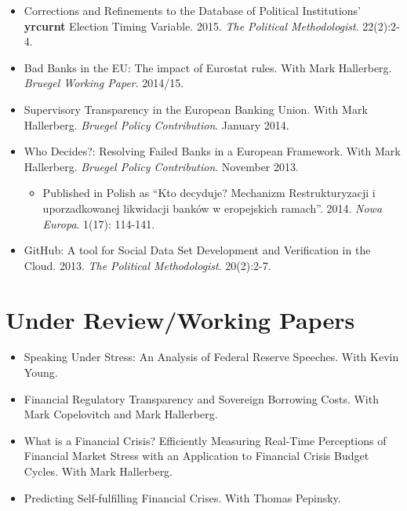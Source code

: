 \documentclass[a4paper]{article}
\begin{document}
{\begin{itemize}
    \item Corrections and Refinements to the Database of Political Institutions' \textbf{yrcurnt} Election Timing Variable. 2015. {\emph{The Political Methodologist}}. 22(2):2-4.

    \item Bad Banks in the EU: The impact of Eurostat rules. With Mark Hallerberg. \emph{Bruegel Working Paper}. 2014/15.

    \item Supervisory Transparency in the European Banking Union. With Mark Hallerberg. {\emph{Bruegel Policy Contribution}}. January 2014.

    \item Who Decides?: Resolving Failed Banks in a European Framework. With Mark Hallerberg. {\emph{Bruegel Policy Contribution}}. November 2013.

      \begin{itemize}
        \item Published in Polish as ``Kto decyduje? Mechanizm Restrukturyzacji i uporzadkowanej likwidacji bank\'{o}w w eropejskich ramach''. 2014. \emph{Nowa Europa}. 1(17): 114-141.
      \end{itemize}

    \item GitHub: A tool for Social Data Set Development and Verification in the Cloud. 2013. {\emph{The Political Methodologist}}. 20(2):2-7.

\end{itemize}


\section*{Under Review/Working Papers}

\begin{itemize}

    \item Speaking Under Stress: An Analysis of Federal Reserve Speeches. With Kevin Young.

    \item Financial Regulatory Transparency and Sovereign Borrowing Costs. With Mark Copelovitch and Mark Hallerberg.

    \item What is a Financial Crisis? Efficiently Measuring Real-Time Perceptions of Financial Market Stress with an Application to Financial Crisis Budget Cycles. With Mark Hallerberg.

    \item Predicting Self-fulfilling Financial Crises. With Thomas Pepinsky.


\end{itemize}}
\end{document}
